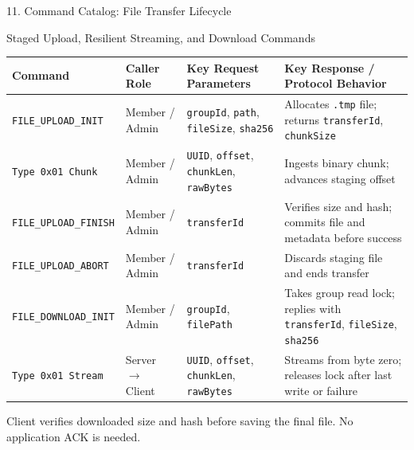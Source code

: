 \documentclass[t, aspectratio=169]{beamer}
\begin{document}
\begin{frame}{11. Command Catalog: File Transfer Lifecycle}
\small
\begin{block}{Staged Upload, Resilient Streaming, and Download Commands}
\end{block}
\vspace{-4pt}
\centering
\scriptsize
\setlength{\tabcolsep}{3pt}
\renewcommand{\arraystretch}{1.0}
\begin{tabularx}{\textwidth}{llp{4.2cm}X}
\toprule
\textbf{Command} & \textbf{Caller Role} & \textbf{Key Request Parameters} & \textbf{Key Response / Protocol Behavior} \\
\midrule
\texttt{FILE\_UPLOAD\_INIT} & Member / Admin & \texttt{groupId}, \texttt{path}, \texttt{fileSize}, \texttt{sha256} & Allocates \texttt{.tmp} file; returns \texttt{transferId}, \texttt{chunkSize} \\
\texttt{Type 0x01 Chunk} & Member / Admin & \texttt{UUID}, \texttt{offset}, \texttt{chunkLen}, \texttt{rawBytes} & Ingests binary chunk; advances staging offset \\
\texttt{FILE\_UPLOAD\_FINISH} & Member / Admin & \texttt{transferId} & Verifies size and hash; commits file and metadata before success \\
\texttt{FILE\_UPLOAD\_ABORT} & Member / Admin & \texttt{transferId} & Discards staging file and ends transfer \\
\midrule
\texttt{FILE\_DOWNLOAD\_INIT} & Member / Admin & \texttt{groupId}, \texttt{filePath} & Takes group read lock; replies with \texttt{transferId}, \texttt{fileSize}, \texttt{sha256} \\
\texttt{Type 0x01 Stream} & Server $\to$ Client & \texttt{UUID}, \texttt{offset}, \texttt{chunkLen}, \texttt{rawBytes} & Streams from byte zero; releases lock after last write or failure \\
\bottomrule
\end{tabularx}
\par\smallskip
\scriptsize Client verifies downloaded size and hash before saving the final file. No application ACK is needed.
\end{frame}
\end{document}
